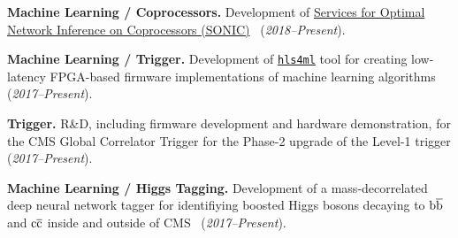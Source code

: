 \documentclass[11pt]{res}
\begin{document}
\begin{resume}
\textbf{Machine Learning / Coprocessors.} Development of \href{https://github.com/hls-fpga-machine-learning/SonicCMS}{Services for Optimal Network Inference on Coprocessors (SONIC)}~\cite{neurips2019_sonic,Duarte:2019fta} (\textit{2018--Present}).

\textbf{Machine Learning / Trigger.} Development of
\href{https://fastmachinelearning.org/hls4ml/}{\texttt{hls4ml}}
tool for creating low-latency FPGA-based firmware
  implementations of machine learning algorithms~\cite{DiGuglielmo:2020eqx,Summers:2020xiy,neurips2019_hls4ml,Duarte:2018ite} (\textit{2017--Present}).

\textbf{Trigger.} R\&D, including firmware development and hardware demonstration, for
the CMS Global Correlator Trigger for the Phase-2 upgrade of the
Level-1 trigger (\emph{2017--Present}).

\textbf{Machine Learning / Higgs Tagging.} Development of a mass-decorrelated deep neural network tagger
  for identifiying boosted Higgs bosons decaying to $\mathrm{b}\overline{\mathrm{b}}$ and $\mathrm{c}\overline{\mathrm{c}}$ inside and outside of  CMS~\cite{Moreno:2019neq,Moreno:2019bmu,neurips2019_hbb,CMS-DP-2018-046}
  (\textit{2017--Present}).



\end{resume}
\end{document}
